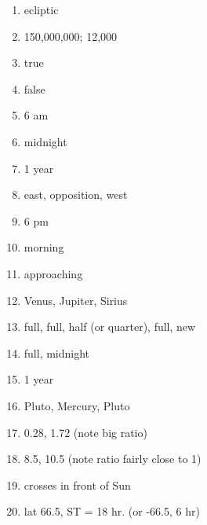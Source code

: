 \begin{enumerate} 

\item 
ecliptic

\item 
150,000,000; 12,000


\item 
true

\item 
false

\item 
6 am 

\item 
midnight

\item
1 year

\item
east, opposition, west

\item
6 pm

\item
morning


\item
approaching 

\item
Venus, Jupiter, Sirius

\item
full, full, half (or quarter), full, new

\item
full, midnight

\item
1 year

\item
Pluto, Mercury, Pluto

\item
0.28, 1.72 (note big ratio)


\item
8.5, 10.5 (note ratio fairly close to 1)

\item
crosses in front of Sun 

\item 
lat 66.5\deg, ST = 18 hr. (or -66.5\deg, 6 hr)


\end{enumerate} 













